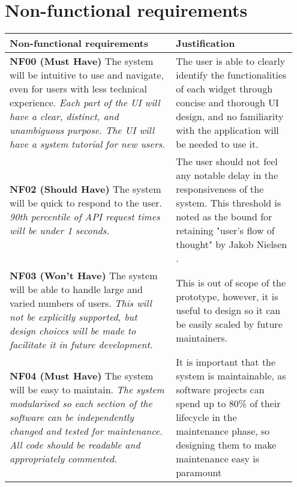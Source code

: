 \documentclass[10pt]{article}
\begin{document}
\vspace{-4mm}\section{Non-functional requirements}\vspace{-2mm}
\begin{longtable}{|p{0.55\linewidth}|p{0.4\linewidth}|}
    \hline
    \textbf{Non-functional requirements}
        &
    \textbf{Justification}
    \\ \hline\hline

    \textbf{NF00 (Must Have) }
    The system will be intuitive to use and navigate, even for users with less
    technical experience.
    \textit{Each part of the UI will have a clear, distinct, and unambiguous
    purpose. The UI will have a system tutorial for new users.}
        &
    The user is able to clearly identify the functionalities of each widget
    through concise and thorough UI design, and no familiarity with the
    application will be needed to use it.
    \\ \hline

    \textbf{NF02 (Should Have) }
    The system will be quick to respond to the user.
    \textit{90th percentile of API request times will be under 1 seconds.}
        &
    The user should not feel any notable delay in the responsiveness of the
    system. This threshold is noted as the bound for retaining "user's flow
    of thought" by Jakob Nielsen \cite{usability_engineering}.
    \\ \hline

    \textbf{NF03 (Won't Have) }
    The system will be able to handle large and varied numbers of users.
    \textit{This will not be explicitly supported, but design choices will be
    made to facilitate it in future development.}
        &
    This is out of scope of the prototype, however, it is useful to design so
    it can be easily scaled by future maintainers.
    \\ \hline

    \textbf{NF04 (Must Have) }
    The system will be easy to maintain.
    \textit{The system modularised so each section of the software can
    be independently changed and tested for maintenance. All code should be
    readable and appropriately commented.}
        &
    It is important that the system is maintainable, as software projects can
    spend up to 80\% of their lifecycle in the maintenance phase, so designing
    them to make maintenance easy is paramount
    \\ \hline


\end{longtable}
\end{document}
